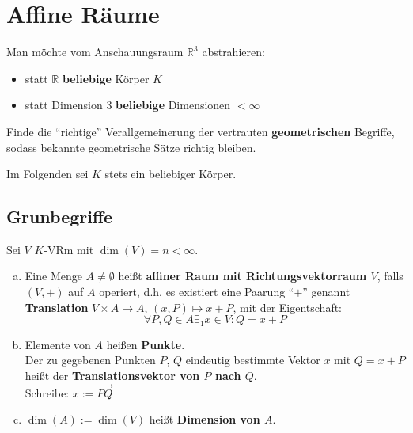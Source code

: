 \documentclass[parskip,a4paper,twoside,DIV15,BCOR12mm]{scrbook}
\begin{document}
\chapter{Affine Räume}

Man möchte vom Anschauungsraum $\mathbb{R}^3$ abstrahieren:\\
\begin{itemize}
\item statt $\mathbb{R}$ \textbf{beliebige} Körper $K$
\item statt Dimension $3$ \textbf{beliebige} Dimensionen $< \infty$
\end{itemize}

\begin{task}
Finde die "`richtige"' Verallgemeinerung der vertrauten \textbf{geometrischen} 
Begriffe, sodass bekannte geometrische Sätze richtig bleiben.
\end{task}

Im Folgenden sei $K$ stets ein beliebiger Körper.

\section{Grunbegriffe}
\begin{definition}
Sei $V$ $K$-VRm mit $\dim(V)=n<\infty$.
\begin{enumerate}[(a)]
\item Eine Menge $A \ne \emptyset$ heißt \textbf{affiner Raum mit Richtungsvektorraum $V$},
falls $(V,+)$ auf $A$ operiert, d.h. es existiert eine Paarung "`$+$"' genannt
\textbf{Translation} $V \times A \to A$, $(x,P) \mapsto x+P$, mit der Eigentschaft:
\[\forall P,Q\in A\exists_1 x\in V: Q=x+P\]
\item Elemente von $A$ heißen \textbf{Punkte}.\\
Der zu gegebenen Punkten $P$, $Q$ eindeutig bestimmte Vektor $x$ mit $Q=x+P$ heißt
der \textbf{Translationsvektor von $P$ nach $Q$}.\\
Schreibe: $x:=\overrightarrow{PQ}$
\item $\dim(A) := \dim(V)$ heißt \textbf{Dimension von $A$}.
\end{enumerate}
\end{definition}

\begin{comment}
\begin{enumerate}
\item Vorsicht in (1) wird das Zeichen "`+"' für verschiedene Verknüpfungen benutzt.
\item Es gilt für $P,Q,R,\in A:$
\begin{align*}
\overrightarrow{PP}&=0\\
\overrightarrow{PQ}+\overrightarrow{QR} &= \overrightarrow{PR}\\
\overrightarrow{QP}&=-\overrightarrow{PQ}
\end{align*} 
\item $A$ besteht aus genau einer Bahn:
\[\forall P\in A: A=V+P:=\{x+P\mid x\in V\}\]
\end{enumerate}
\end{comment}
\end{document}

